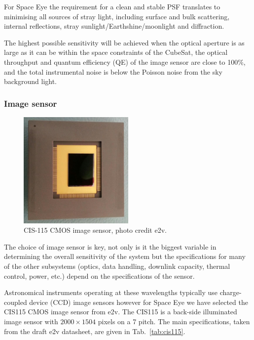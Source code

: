 \documentclass[]{iac}
\begin{document}
For Space Eye the requirement for a clean and stable PSF translates to minimising all sources of stray light, including
surface and bulk scattering, internal reflections, stray sunlight/Earthshine/moonlight and diffraction.

The highest possible sensitivity will be achieved when the optical aperture is as large as it can be within the space
constraints of the CubeSat, the optical throughput and quantum efficiency (QE) of the image sensor are close to 100\%,
and the total instrumental noise is below the Poisson noise from the sky background light.

\subsubsection{Image sensor}

\begin{figure}[tp]
  \center \includegraphics[width=0.5\textwidth]{figures/cis115.png}
  \caption{\label{fig:cis115}CIS-115 CMOS image sensor, photo credit e2v.}
\end{figure}

The choice of image sensor is key, not only is it the biggest variable in determining the overall sensitivity of the
system but the specifications for many of the other subsystems (optics, data handling, downlink capacity, thermal
control, power, etc.) depend on the specifications of the sensor.

Astronomical instruments operating at these wavelengths typically use charge-coupled device (CCD) image sensors however
for Space Eye we have selected the CIS115 CMOS image sensor from e2v\cite{Jorden2014}. The CIS115 is a back-side
illuminated image sensor with $2000 \times 1504$ pixels on a \SI{7}{\micron} pitch. The main specifications, taken from
the draft e2v datasheet, are given in Tab.~\ref{tab:cis115}.
\end{document}
